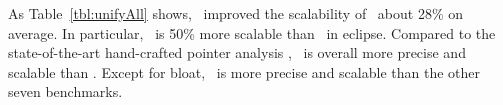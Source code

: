 As Table~\ref{tbl:unifyAll} shows, \ourtool~improved the scalability of \callSL~about 28\% on average. In particular, \callSLG~is 50\% more scalable than \callSL~in eclipse. Compared to the state-of-the-art hand-crafted pointer analysis \BatonUnity, \callSLG~is overall more precise and scalable than \BatonUnity. Except for bloat, \callSLG~is more precise and scalable than the other seven benchmarks.





